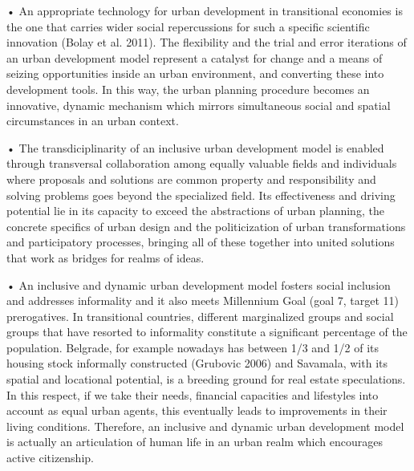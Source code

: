 \documentclass[11pt]{report}
\begin{document}
•	An appropriate technology for urban development in transitional economies is the one that carries wider social repercussions for such a specific scientific innovation (Bolay et al. 2011). The flexibility and the trial and error iterations of an urban development model represent a catalyst for change and a means of seizing opportunities inside an urban environment, and converting these into development tools. In this way, the urban planning procedure becomes an innovative, dynamic mechanism which mirrors simultaneous social and spatial circumstances in an urban context.

•	The transdiciplinarity of an inclusive urban development model is enabled through transversal collaboration among equally valuable fields and individuals where proposals and solutions are common property and responsibility and solving problems goes beyond the specialized field. Its effectiveness and driving potential lie in its capacity to exceed the abstractions of urban planning, the concrete specifics of urban design and the politicization of urban transformations and participatory processes,  bringing all of these together  into united solutions that work as bridges for realms of ideas.

•	An inclusive and dynamic urban development model fosters social inclusion and addresses informality and it also meets Millennium Goal (goal 7, target 11) prerogatives. In transitional countries, different marginalized groups and social groups that have resorted to informality constitute a significant percentage of the population. Belgrade, for example nowadays has between 1/3 and 1/2 of its housing stock informally constructed (Grubovic 2006) and Savamala, with its spatial and locational potential, is a breeding ground for real estate speculations. In this respect, if we take their needs, financial capacities and lifestyles into account as equal urban agents, this eventually leads to improvements in their living conditions. Therefore, an inclusive and dynamic urban development model is actually an articulation of human life in an urban realm which encourages active citizenship.


\begin{small}

\end{small}



\newpage
\appendix
\noappendicestocpagenum
\addappheadtotoc
\end{document}
